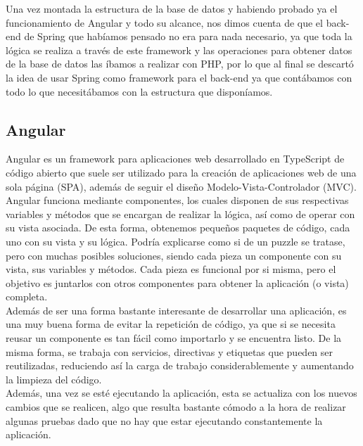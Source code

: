 Una vez montada la estructura de la base de datos y habiendo probado ya el funcionamiento de Angular y todo su alcance, nos dimos cuenta de que el back-end de Spring que habíamos pensado no era para nada necesario, ya que toda la lógica se realiza a través de este framework y las operaciones para obtener datos de la base de datos las íbamos a realizar con PHP, por lo que al final se descartó la idea de usar Spring como framework para el back-end ya que contábamos con todo lo que necesitábamos con la estructura que disponíamos.\\

\clearpage

\subsection{Angular}

Angular es un framework para aplicaciones web desarrollado en TypeScript de código abierto que suele ser utilizado para la creación de aplicaciones web de una sola página (SPA), además de seguir el diseño Modelo-Vista-Controlador (MVC).\\

Angular funciona mediante componentes, los cuales disponen de sus respectivas variables y métodos que se encargan de realizar la lógica, así como de operar con su vista asociada. De esta forma, obtenemos pequeños paquetes de código, cada uno con su vista y su lógica. Podría explicarse como si de un puzzle se tratase, pero con muchas posibles soluciones, siendo cada pieza un componente con su vista, sus variables y métodos. Cada pieza es funcional por si misma, pero el objetivo es juntarlos con otros componentes para obtener la aplicación (o vista) completa.\\

Además de ser una forma bastante interesante de desarrollar una aplicación, es una muy buena forma de evitar la repetición de código, ya que si se necesita reusar un componente es tan fácil como importarlo y se encuentra listo. De la misma forma, se trabaja con servicios, directivas y etiquetas que pueden ser reutilizadas, reduciendo así la carga de trabajo considerablemente y aumentando la limpieza del código.\\

Además, una vez se esté ejecutando la aplicación, esta se actualiza con los nuevos cambios que se realicen, algo que resulta bastante cómodo a la hora de realizar algunas pruebas dado que no hay que estar ejecutando constantemente la aplicación.\\

